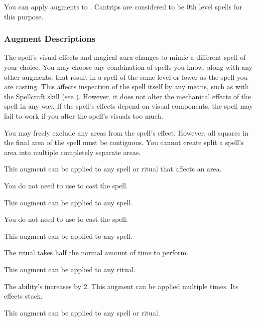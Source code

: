         You can apply augments to .
        Cantrips are considered to be 0th level spells for this purpose.

        \subsubsection{Augment Descriptions}\label{Augment Descriptions}

             The spell's visual effects and magical aura changes to mimic a different spell of your choice.
            You may choose any combination of spells you know, along with any other augments, that result in a spell of the same level or lower as the spell you are casting.
            This affects inspection of the spell itself by any means, such as with the Spellcraft skill (see ).
            However, it does not alter the mechanical effects of the spell in any way.
            If the spell's effects depend on visual components, the spell may fail to work if you alter the spell's visuals too much. 

             You may freely exclude any areas from the spell's effect.
            However, all squares in the final area of the spell must be contiguous.
            You cannot create split a spell's area into multiple completely separate areas.
            \par This augment can be applied to any spell or ritual that affects an area.

             You do not need to use  to cast the spell.
            \par This augment can be applied to any spell.

             You do not need to use  to cast the spell.
            \par This augment can be applied to any spell.

             The ritual takes half the normal amount of time to perform.
            \par This augment can be applied to any ritual.

             The ability's  increases by 2.
            This augment can be applied multiple times.
            Its effects stack.
            \par This augment can be applied to any spell or ritual.

